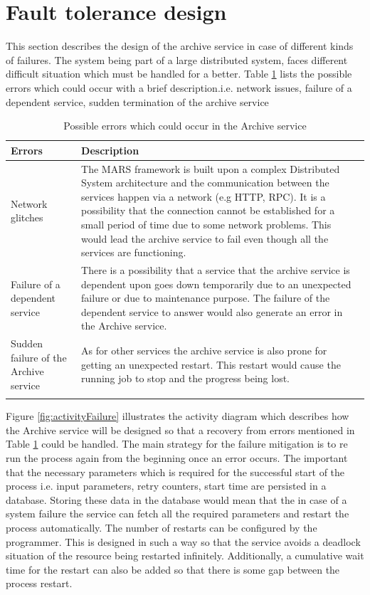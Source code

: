 \newpage
\section{Fault tolerance design}
This section describes the design of the archive service in case of different kinds of failures. The system being part of a large distributed system,
faces different difficult situation which must be handled for a better. Table \ref{table:probServices} lists the possible errors which 
could occur with a brief description.i.e. network issues, failure of a 
dependent service, sudden termination of the archive service 
\begin{longtable}{|p{4cm}|p{10cm}|}
    \hline
        \textbf{Errors}  & \textbf{Description}\\
    \hline
        Network glitches & The MARS framework is built upon a complex Distributed System architecture and the communication between the services
        happen via a network (e.g HTTP, RPC). It is a possibility that the connection cannot be established for a small period of time due to some network problems.
        This would lead the archive service to fail even though all the services are functioning.\\
    \hline
        Failure of a dependent service & There is a possibility that a service that the archive service is dependent upon goes down temporarily due to an unexpected
        failure or due to maintenance purpose. The failure of the dependent service to answer would also generate an error in the Archive service.\\
    \hline
        Sudden failure of the Archive service & As for other services the archive service is also prone for getting an unexpected restart. This restart would cause
        the running job to stop and the progress being lost.\\    
    \hline
    \caption{Possible errors which could occur in the Archive service}
    \label{table:probServices} 
\end{longtable}

Figure \ref{fig:activityFailure} illustrates the activity diagram which describes how the Archive service will be designed so that a recovery from errors mentioned in
Table \ref{table:probServices} could be handled. The main strategy for the failure mitigation is to re run the process again from the beginning once an error occurs. 
The important that the necessary parameters which is required for the successful start of the process i.e. input parameters, retry counters, start time are persisted
in a database. Storing these data in the database would mean that the in case of a system failure the service can fetch all the required parameters and restart the 
process automatically. The number of restarts can be configured by the programmer. This is designed in such a way so that the service avoids a deadlock situation of the
resource being restarted infinitely. Additionally, a cumulative wait time for the restart can also be added so that there is some gap between the process restart.

